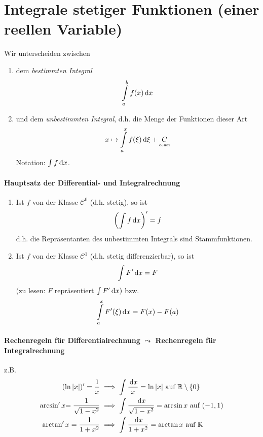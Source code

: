 \appendix
\newpage
\section{Integrale stetiger Funktionen \small (einer reellen Variable)}
Wir unterscheiden zwischen
\begin{enumerate}[- ,topsep =-3pt]
	\item dem \emph{bestimmten Integral}
				$$ \int\limits_a^b f(x)\, \mathrm{d} x$$
	\item und dem \emph{unbestimmten Integral}, d.h. die Menge der Funktionen dieser Art
	$$x \mapsto \int\limits_a^x f(\xi) \, \mathrm{d} \xi + \underset{\text{\tiny const}}C$$
	Notation: $\int f \, \mathrm{d} x$.
\end{enumerate}
\paragraph{Hauptsatz der Differential- und Integralrechnung}
\begin{enumerate}[(\roman*), topsep = -1 pt]
	\item Ist $f$ von der Klasse $\mathcal{C}^0$ (d.h. stetig), so ist 
		$$\left(\int f \, \mathrm{d} x\right)' = f$$
		d.h. die Repräsentanten des unbestimmten Integrals sind Stammfunktionen.
	\item Ist $f$ von der Klasse $\mathcal{C}^1$ (d.h. stetig differenzierbar), so ist
	$$ \int F' \, \mathrm{d} x =F$$
	(zu lesen: $F$ repräsentiert $\int F' \, \mathrm{d} x)$ bzw.
	$$ \int\limits_a^x F'(\xi) \, \mathrm{d} x = F(x) -F(a)$$
\end{enumerate}
\paragraph{Rechenregeln für Differentialrechnung $\leadsto$ Rechenregeln für Integralrechnung}z.B.
\begin{equation*}
	\begin{split}
		(\ln |x|)' = \frac{1}{x} & \implies \int \frac{\, \mathrm{d} x}{x} = \ln |x| \text{ auf } \mathbb{R}\setminus\{0\}\\
		\arcsin' x {=\frac{1}{\sqrt{1-x^2}}} & \implies \int \frac{\, \mathrm{d} x}{\sqrt{1-x^2}} = \arcsin x \text{ auf } (-1,1) \\ 		
		\arctan' x = \frac{1}{1+x^2} & \implies \int \frac{\, \mathrm{d} x}{1+x^2} = \arctan x \text{ auf }\mathbb{R}
	\end{split}
\end{equation*}
